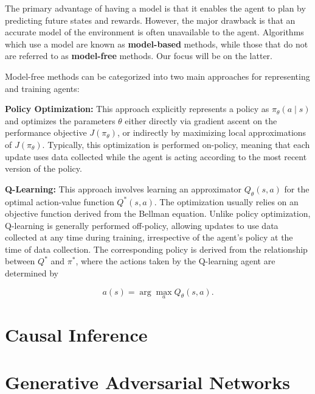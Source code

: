 The primary advantage of having a model is that it enables the agent
to plan by predicting future states and rewards.
However, the major drawback is that an accurate model of the environment
is often unavailable to the agent.
Algorithms which use a model are known as \textbf{model-based} methods,
while those that do not are referred to as \textbf{model-free} methods.
Our focus will be on the latter.

Model-free methods can be categorized into two main approaches
for representing and training agents:

\textbf{Policy Optimization:} This approach explicitly represents a policy
as \( \pi_{\theta}(a \mid s) \) and optimizes the parameters \( \theta \)
either directly via gradient ascent on the performance objective \( J(\pi_{\theta}) \), or indirectly by maximizing local approximations of \( J(\pi_{\theta}) \). Typically, this optimization is performed on-policy, meaning that each update uses data collected while the agent is acting according to the most recent version of the policy.

\textbf{Q-Learning:} This approach involves learning an approximator \( Q_{\theta}(s,a) \) for the optimal action-value function \( Q^*(s,a) \). The optimization usually relies on an objective function derived from the Bellman equation. Unlike policy optimization, Q-learning is generally performed off-policy, allowing updates to use data collected at any time during training, irrespective of the agent's policy at the time of data collection. The corresponding policy is derived from the relationship between \( Q^* \) and \( \pi^* \), where the actions taken by the Q-learning agent are determined by

\[
a(s) = \arg \max_a Q_{\theta}(s,a).
\]


\section{Causal Inference}

\cite{Neal_2020a}

\section{Generative Adversarial Networks}